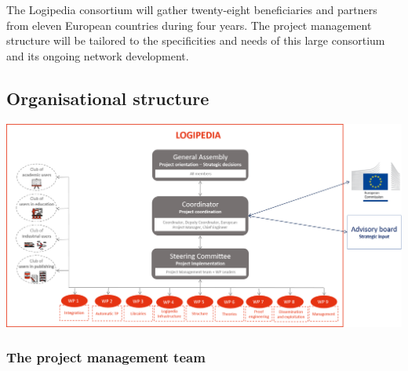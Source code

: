 The Logipedia consortium will gather twenty-eight beneficiaries and partners
from eleven European countries during four years. The project management
structure will be tailored to the specificities and needs of this
large consortium and its ongoing network development.

\subsection*{Organisational structure}

\includegraphics[width=\textwidth]{img/Gouvernance}

\subsubsection*{The project management team}

